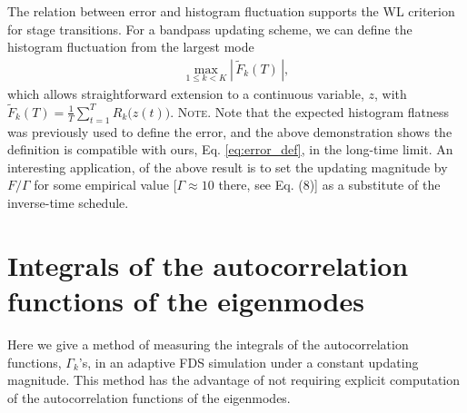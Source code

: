 \documentclass[preprint, superscriptaddress, floatfix]{revtex4-1}
\newcommand{\note}[1]{{\color{DarkGreen}\footnotesize \textsc{Note.} #1}}
\begin{document}
The relation between error and histogram fluctuation
supports the WL criterion for stage transitions.
%
%
For a bandpass updating scheme,
we can define the histogram fluctuation
from the largest mode
\begin{align}
  \max_{1 \le k < K} \left| \, \tilde F_k(T) \, \right|
  ,
  \label{eq:maxFk}
\end{align}
%
which allows straightforward extension
to a continuous variable, $z$, with
$\tilde F_k(T) = \frac 1 T \sum_{t = 1}^T R_k\bigl( z(t) \bigr)$.
%
\note{
Note that the expected histogram flatness
was previously used to define the error\cite{zhou2005, zhou2008},
and the above demonstration shows the definition
is compatible with ours, Eq. \eqref{eq:error_def}, in the long-time limit.
An interesting application\cite{zhou2008},
of the above result is
to set the updating magnitude by $F/\Gamma$
for some empirical value [$\Gamma \approx 10$ there, see Eq. (8)]
as a substitute of the inverse-time schedule.
}




\section{\label{sec:Gamma_measure}
Integrals of the autocorrelation functions of the eigenmodes
}



Here we give a method of measuring
the integrals of the autocorrelation functions, $\Gamma_k$'s,
in an adaptive FDS simulation
under a constant updating magnitude.
%
This method has the advantage of not requiring
explicit computation of
the autocorrelation functions of the eigenmodes.
\end{document}
